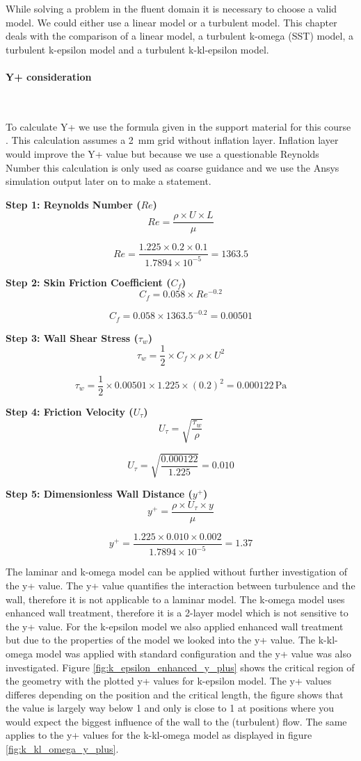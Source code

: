 While solving a problem in the fluent domain it is necessary to choose a valid model. We could either use a linear model or a turbulent model.
This chapter deals with the comparison of a linear model, a turbulent k-omega (SST) model, a turbulent k-epsilon model and a turbulent k-kl-epsilon model.

\paragraph{Y+ consideration}~

To calculate Y+ we use the formula given in the support material for this course \cite{y_plus_calc}. This calculation assumes a \SI{2}{\mm} grid without inflation layer. Inflation layer would improve the Y+ value but because we use a questionable Reynolds Number this calculation is only used as coarse guidance and we use the Ansys simulation output later on to make a statement.

\textbf{Step 1: Reynolds Number (\( Re \))}
\[
Re = \frac{\rho \times U \times L}{\mu}
\]

\[
Re = \frac{1.225 \times 0.2 \times 0.1}{1.7894 \times 10^{-5}} = 1363.5
\]

\textbf{Step 2: Skin Friction Coefficient (\( C_f \))}
\[
C_f = 0.058 \times Re^{-0.2}
\]

\[
C_f = 0.058 \times 1363.5^{-0.2} = 0.00501
\]

\textbf{Step 3: Wall Shear Stress (\( \tau_w \))}
\[
\tau_w = \frac{1}{2} \times C_f \times \rho \times U^2
\]

\[
\tau_w = \frac{1}{2} \times 0.00501 \times 1.225 \times (0.2)^2 = 0.000122 \, \text{Pa}
\]

\textbf{Step 4: Friction Velocity (\( U_\tau \))}
\[
U_\tau = \sqrt{\frac{\tau_w}{\rho}}
\]

\[
U_\tau = \sqrt{\frac{0.000122}{1.225}} = 0.010
\]

\textbf{Step 5: Dimensionless Wall Distance (\( y^+ \))}
\[
y^+ = \frac{\rho \times U_\tau \times y}{\mu}
\]

\[
y^+ = \frac{1.225 \times 0.010 \times 0.002}{1.7894 \times 10^{-5}} = 1.37
\]



The laminar and k-omega model can be applied without further investigation of the y+ value. The y+ value quantifies the interaction between turbulence and the wall, therefore it is not applicable to a laminar model. The k-omega model uses enhanced wall treatment, therefore it is a 2-layer model which is not sensitive to the y+ value.
For the k-epsilon model we also applied enhanced wall treatment but due to the properties of the model we looked into the y+ value. The k-kl-omega model was applied with standard configuration and the y+ value was also investigated. Figure \ref{fig:k_epsilon_enhanced_y_plus} shows the critical region of the geometry with the plotted y+ values for k-epsilon model. The y+ values differes depending on the position and the critical length, the figure shows that the value is largely way below 1 and only is close to 1 at positions where you would expect the biggest influence of the wall to the (turbulent) flow.
The same applies to the y+ values for the k-kl-omega model as displayed in figure \ref{fig:k_kl_omega_y_plus}.

